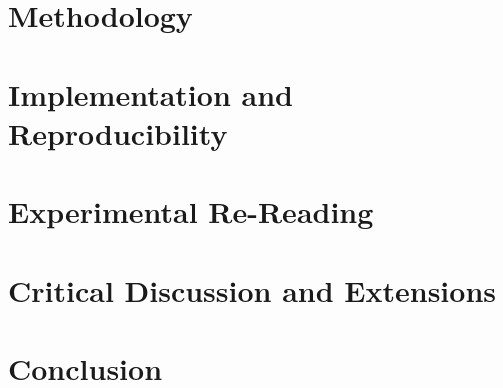 \documentclass[10pt, journal, compsoc]{IEEEtran}
\begin{document}
\section{Methodology}


\section{Implementation and Reproducibility}


\section{Experimental Re-Reading}


\section{Critical Discussion and Extensions}


\section{Conclusion}




\end{document}
